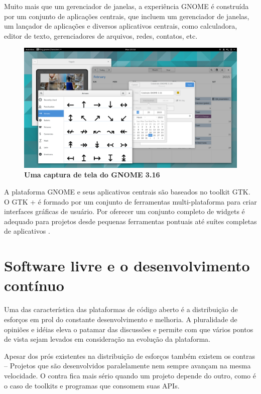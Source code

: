 Muito mais que um gerenciador de janelas, a experiência GNOME é construída por
um conjunto de aplicações centrais, que incluem um gerenciador de janelas, um
lançador de aplicações e diversos aplicativos centrais, como calculadora,
editor de texto, gerenciadores de arquivos, redes, contatos, etc.

\begin{figure}[h!]
  \begin{center}
    \label{mclasen-new-apps}
    \caption{\textbf{Uma captura de tela do GNOME 3.16}}
    \includegraphics [width=\textwidth]{image/mclasen-new-apps.png}
  \end{center}
\end{figure}

A plataforma GNOME e seus aplicativos centrais são baseados no toolkit GTK. O
GTK + é formado por um conjunto de ferramentas multi-plataforma para criar
interfaces gráficas de usuário. Por oferecer um conjunto completo de widgets é
adequado para projetos desde pequenas ferramentas pontuais até suítes completas
de aplicativos \cite{gtk-org}.

\section{Software livre e o desenvolvimento contínuo}

Uma das característica das plataformas de código aberto é a distribuição de
esforços em prol do constante desenvolvimento e melhoria. A pluralidade de
opiniões e idéias eleva o patamar das discussões e permite com que vários pontos
de vista sejam levados em consideração na evolução da plataforma.

Apesar dos prós existentes na distribuição de esforços também existem os contras
-- Projetos que são desenvolvidos paralelamente nem sempre avançam na mesma
velocidade. O contra fica mais sério quando um projeto depende do outro, como é
o caso de toolkits e programas que consomem suas APIs.

